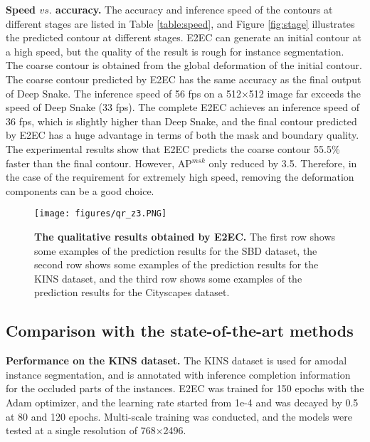 \documentclass[10pt,twocolumn,letterpaper]{article}
\begin{document}
\textbf{Speed $vs.$ accuracy.} The accuracy and inference speed of the contours at different stages are listed in Table \ref{table:speed}, and Figure \ref{fig:stage} illustrates the predicted contour at different stages. E2EC can generate an initial contour at a high speed, but the quality of the result is rough for instance segmentation. The coarse contour is obtained from the global deformation of the initial contour. The coarse contour predicted by E2EC has the same accuracy as the final output of Deep Snake. The inference speed of 56 fps on a 512×512 image far exceeds the speed of Deep Snake (33 fps). The complete E2EC achieves an inference speed of 36 fps, which is slightly higher than Deep Snake, and the final contour predicted by E2EC has a huge advantage in terms of both the mask and boundary quality. The experimental results show that E2EC predicts the coarse contour 55.5\% faster than the final contour. However, AP$^{msk}$ only reduced by 3.5. Therefore, in the case of the requirement for extremely high speed, removing the deformation components can be a good choice.
\begin{figure*}[t]
  \centering\vspace{-5mm}
   \texttt{[image: figures/qr\_z3.PNG]}\vspace{-3mm}
   \caption{\textbf{The qualitative results obtained by E2EC.} The first row shows some examples of the prediction results for the SBD dataset, the second row shows some examples of the prediction results for the KINS dataset, and the third row shows some examples of the prediction results for the Cityscapes dataset.}\vspace{-7mm}
   \label{fig:demo}
\end{figure*}




\vspace{-3mm}\subsection{Comparison with the state-of-the-art methods}\vspace{-2mm}
\textbf{Performance on the KINS dataset.} The KINS dataset is used for amodal instance segmentation, and is annotated with inference completion information for the occluded parts of the instances. E2EC was trained for 150 epochs with the Adam optimizer, and the learning rate started from 1e-4 and was decayed by 0.5 at 80 and 120 epochs. Multi-scale training was conducted, and the models were tested at a single resolution of 768×2496.
\end{document}
